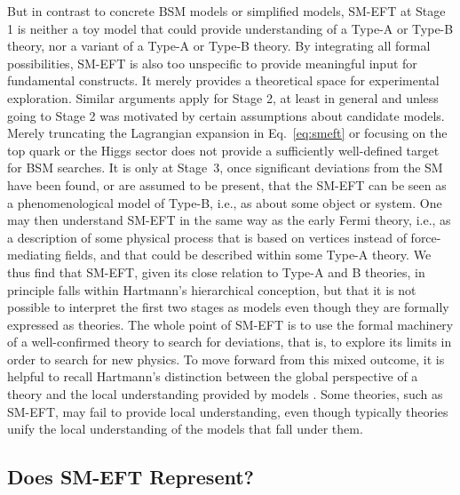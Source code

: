 But in contrast to concrete BSM models or simplified models, SM-EFT at Stage 1 is neither a toy model \citep[see][]{Reutlinger2018} that could provide understanding of a Type-A or Type-B theory, nor a variant of a Type-A or Type-B theory. 
By integrating all formal possibilities, SM-EFT is also too unspecific to provide meaningful input for fundamental constructs. 
It merely provides a theoretical space for experimental exploration.
Similar arguments apply for Stage 2, at least in general and unless going to Stage 2 was motivated by certain assumptions about candidate models.
Merely truncating the Lagrangian expansion in Eq.~\ref{eq:smeft} or focusing on the top quark or the Higgs sector does not provide a sufficiently well-defined target for BSM searches.
It is only at Stage~3, once significant deviations from the SM have been found, or are assumed to be present, that the SM-EFT can be seen as
a phenomenological model of Type-B, i.e., as about some object or system.
One may then understand SM-EFT in the same way as the early Fermi theory, i.e., as a description of some physical process that is based on vertices instead of force-mediating fields, and that could be described within some Type-A theory.
We thus find that SM-EFT, given its close relation to Type-A and B theories, in principle falls within Hartmann's hierarchical conception, but that it is not possible to interpret the first two stages as models even though they are formally expressed as theories.
The whole point of SM-EFT is to use the formal machinery of a well-confirmed theory to search for deviations, that is, to explore its limits in order to search for new physics. 
To move forward from this mixed outcome, it is helpful to recall Hartmann's distinction between the global perspective of a theory and the local understanding provided by models \citep{hartmann2001}. 
Some theories, such as SM-EFT, may fail to provide local understanding, even though typically theories unify the local understanding of the models that fall under them.


\subsection{Does SM-EFT Represent?}
\label{sub:smeftrep} 

